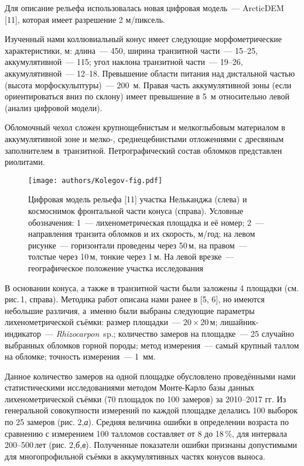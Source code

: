 Для описание рельефа использовалась новая цифровая модель~--- ArcticDEM [11], которая имеет разрешение 2 м/пиксель.

Изученный нами коллювиальный конус имеет следующие морфометрические характеристики, м: длина~---  450, ширина транзитной части~---  15--25, аккумулятивной~--- 115; угол наклона транзитной части~--- 19--26\dg, аккумулятивной~--- 12--18\dg. Превышение области питания над дистальной частью (высота морфоскульптуры)~--- 200~м. Правая часть аккумулятивной зоны (если ориентироваться вниз по склону) имеет превышение в 5~м относительно левой (анализ цифровой модели).

Обломочный чехол сложен крупнощебнистым и мелкоглыбовым материалом в аккумулятивной зоне и мелко-, среднещебнистыми отложениями с дресвяным заполнителем в~транзитной. Петрографический состав обломков представлен риолитами.

\begin{figure}[H]
  \centering
  \texttt{[image: authors/Kolegov-fig.pdf]}
  \caption{Цифровая модель рельефа [11] участка Нельканджа (слева) и космоснимок фронтальной части конуса (справа). Условные обозначения: 1~--- лихенометрическая площадка и её номер; 2~--- направления транзита обломков и их скорость, м/год; на левом рисунке~--- горизонтали проведены через 50\,м, на правом~--- толстые через 10\,м, тонкие через 1\,м. На левой врезке~--- географическое положение участка исследования}
  \label{fig:kolegov-fig}
\end{figure}

В основании конуса, а также в транзитной части были заложены 4 площадки (см. рис.\,1, справа). Методика работ описана нами ранее в [5, 6], но имеются небольшие различия, а~именно были выбраны следующие параметры лихенометрической съёмки:  размер площадки~--- 20\,$\times$\,20\,м; лишайник-индикатор~--- \textit{Rhizocarpon}~sp.; количество замеров на площадке~--- 25 случайно выбранных обломков горной породы; метод измерения~--- самый крупный таллом на обломке; точность измерения~--- 1~мм.

Данное количество замеров на одной площадке обусловлено проведёнными нами статистическими исследованиями методом Монте-Карло базы данных лихенометрической съёмки (70 площадок по 100 замеров) за 2010--2017 гг. Из генеральной совокупности измерений по каждой площадке делались 100 выборок по 25 замеров (рис. 2,\textit{а}). Средняя величина ошибки в определении возраста по сравнению с измерением 100 талломов составляет от 8 до 18\,\%, для интервала 200--500\,лет (рис. 2,\textit{б,в}).  Полученные показатели ошибки признаны допустимыми для многопрофильной съёмки в аккумулятивных частях конусов выноса.



